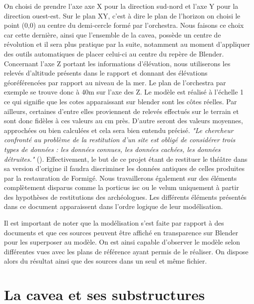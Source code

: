 On choisi de prendre l'axe axe X pour la direction sud-nord et l'axe Y pour la direction ouest-est. Sur le plan XY, c'est à dire le plan de l'horizon on choisi le point (0,0) au centre du demi-cercle formé par l'\gls{orchestra}. Nous faisons ce choix car cette dernière, ainsi que l'ensemble de la \gls{cavea}, possède un centre de révolution et il sera plus pratique par la suite, notamment au moment d'appliquer des outils automatiques de placer celui-ci au centre du repère de Blender. Concernant l'axe Z portant les informations d'élévation, nous utiliserons les relevés d'altitude présents dans le rapport \cite{orangePl} et donnant des élévations géoréférencées par rapport au niveau de la mer. Le plan de l'\gls{orchestra} par exemple se trouve donc à 40m sur l'axe des Z. Le modèle est réalisé à l'échelle 1 ce qui signifie que les cotes apparaissant sur blender sont les côtes réelles. Par ailleurs, certaines d'entre elles proviennent de relevés effectués sur le terrain et sont donc fidèles à ces valeurs au cm près. D'autre seront des valeurs moyennes, approchées ou bien calculées et cela sera bien entendu précisé. \textit{"Le chercheur confronté au problème de la restitution d’un site est obligé de considérer trois types de données : les données connues, les données cachées, les données détruites."} (\cite{golvin}). Effectivement, le but de ce projet étant de restituer le théâtre dans sa version d'origine il faudra discriminer les données antiques de celles produites par la restauration de Formigé. 
Nous travaillerons également sur des éléments complètement disparus comme la \gls{porticus isc} ou le velum uniquement à partir des hypothèses de restitutions des archéologues. Les différents éléments présentés dans ce document apparaissent dans l'ordre logique de leur modélisation.

Il est important de noter que la modélisation s'est faite par rapport à des documents et que ces sources peuvent être affiché en transparence sur Blender pour les superposer au modèle. On est ainsi capable d'observer le modèle selon différentes vues avec les plans de référence ayant permis de le réaliser. On dispose alors du résultat ainsi que des sources dans un seul et même fichier.

\section{La cavea et ses substructures}  
	\label{La cavea et ses substructures}

